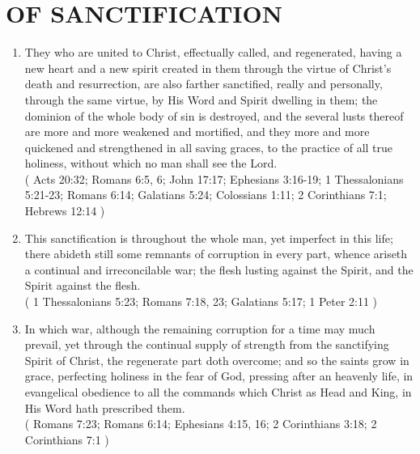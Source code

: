 \documentclass[12pt,a4paper]{book}
\begin{document}
\chapter{OF SANCTIFICATION}
\label{ch-san}
\begin{enumerate}
\item
\label{ch-san-1}
They who are united to Christ, effectually called, and regenerated, having a new heart and a new spirit created in them through the virtue of Christ's death and resurrection, are also farther sanctified, really and personally, through the same virtue, by His Word and Spirit dwelling in them; the dominion of the whole body of sin is destroyed, and the several lusts thereof are more and more weakened and mortified, and they more and more quickened and strengthened in all saving graces, to the practice of all true holiness, without which no man shall see the Lord.\\
( Acts 20:32; Romans 6:5, 6; John 17:17; Ephesians 3:16-19; 1 Thessalonians 5:21-23; Romans 6:14; Galatians 5:24; Colossians 1:11; 2 Corinthians 7:1; Hebrews 12:14 )
\item
\label{ch-san-2}
This sanctification is throughout the whole man, yet imperfect in this life; there abideth still some remnants of corruption in every part, whence ariseth a continual and irreconcilable war; the flesh lusting against the Spirit, and the Spirit against the flesh.\\
( 1 Thessalonians 5:23; Romans 7:18, 23; Galatians 5:17; 1 Peter 2:11 )
\item
\label{ch-san-3}
In which war, although the remaining corruption for a time may much prevail, yet through the continual supply of strength from the sanctifying Spirit of Christ, the regenerate part doth overcome; and so the saints grow in grace, perfecting holiness in the fear of God, pressing after an heavenly life, in evangelical obedience to all the commands which Christ as Head and King, in His Word hath prescribed them.\\
( Romans 7:23; Romans 6:14; Ephesians 4:15, 16; 2 Corinthians 3:18; 2 Corinthians 7:1 )
\end{enumerate}
\end{document}

